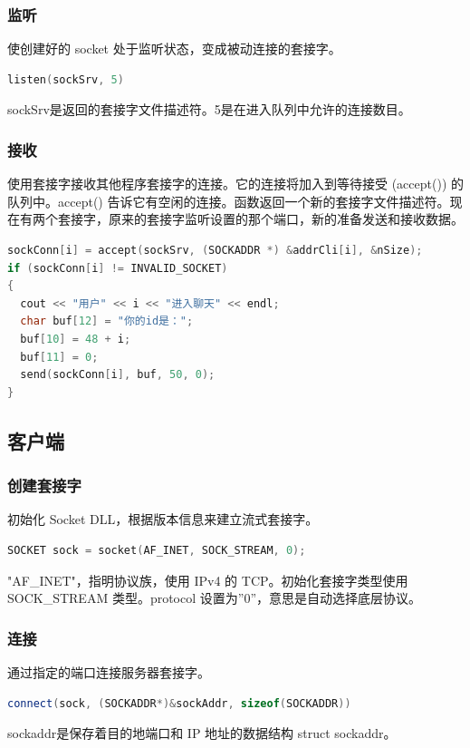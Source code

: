 \documentclass[UTF8,a4paper,10pt]{ctexart}
\begin{document}
\subsubsection{监听}
使创建好的 socket 处于监听状态，变成被动连接的套接字。
\begin{lstlisting}[frame=trbl,language={C++}]
listen(sockSrv, 5)
\end{lstlisting}
sockSrv是返回的套接字文件描述符。5是在进入队列中允许的连接数目。
\subsubsection{接收}
使用套接字接收其他程序套接字的连接。它的连接将加入到等待接受 (accept()) 的队列中。accept() 告诉它有空闲的连接。函数返回一个新的套接字文件描述符。现在有两个套接字，原来的套接字监听设置的那个端口，新的准备发送和接收数据。
\begin{lstlisting}[frame=trbl,language={C++}]
sockConn[i] = accept(sockSrv, (SOCKADDR *) &addrCli[i], &nSize);
if (sockConn[i] != INVALID_SOCKET)
{
  cout << "用户" << i << "进入聊天" << endl;
  char buf[12] = "你的id是：";
  buf[10] = 48 + i;
  buf[11] = 0;
  send(sockConn[i], buf, 50, 0);
}
\end{lstlisting}
\subsection{客户端}
\subsubsection{创建套接字}
初始化 Socket DLL，根据版本信息来建立流式套接字。
\begin{lstlisting}[frame=trbl,language={C++}]
SOCKET sock = socket(AF_INET, SOCK_STREAM, 0);
\end{lstlisting}
"AF\_INET"，指明协议族，使用 IPv4 的 TCP。初始化套接字类型使用 SOCK\_STREAM 类型。protocol 设置为”0”，意思是自动选择底层协议。
\subsubsection{连接}
通过指定的端口连接服务器套接字。
\begin{lstlisting}[frame=trbl,language={C++}]
connect(sock, (SOCKADDR*)&sockAddr, sizeof(SOCKADDR))
\end{lstlisting}
sockaddr是保存着目的地端口和 IP 地址的数据结构 struct sockaddr。
\end{document}
